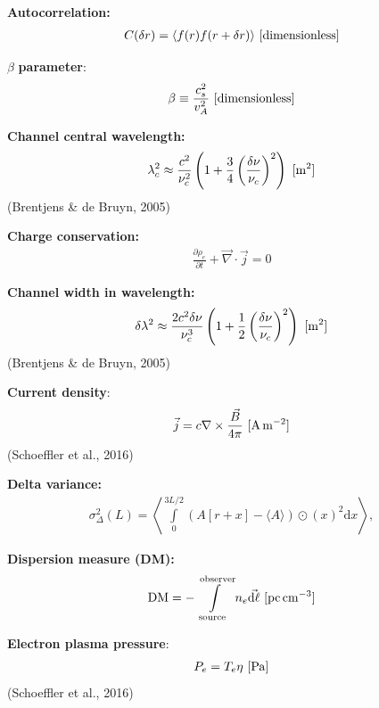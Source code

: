 \documentclass[a4paper,10pt]{article}
\begin{document}
{\noindent}\textbf{Autocorrelation:}
\begin{align*}
    C(\delta r) = \langle f(r)f(r+\delta r)\rangle ~ [{\rm dimensionless}]
\end{align*}

{\noindent}$\beta$ \textbf{parameter}: 
\begin{align*}
    \beta \equiv \frac{c_s^2}{v_A^2} ~ [{\rm dimensionless}]
\end{align*}

{\noindent}\textbf{Channel central wavelength:} 
\begin{align*}
\lambda_c^2 \approx \dfrac{c^2}{\nu_c^2} \left(1+\dfrac{3}{4}\left(\dfrac{\delta\nu}{\nu_c}\right)^2\right) ~ [{\rm m^2}]
\end{align*}
(Brentjens \& de Bruyn, 2005)

{\noindent}\textbf{Charge conservation:} 
\begin{align*}
    \frac{\partial\rho_e}{\partial t} + \vec\nabla\cdot\vec{j} = 0
\end{align*}

{\noindent}\textbf{Channel width in wavelength:} 
\begin{align*}
\delta\lambda^2 \approx \dfrac{2c^2\delta\nu}{\nu_c^3} \left(1+\dfrac{1}{2}\left(\dfrac{\delta\nu}{\nu_c}\right)^2\right) ~ [{\rm m^2}]
\end{align*}
(Brentjens \& de Bruyn, 2005)

{\noindent}\textbf{Current density}:
\begin{align*}
    \vec{j} = c\nabla\times\frac{\vec{B}}{4\pi} ~ [{\rm A\,m^{-2}}]
\end{align*}
(Schoeffler et al., 2016)

{\noindent}\textbf{Delta variance:}
\begin{align*}
    \sigma_\Delta^2(L) = \left\langle \int\limits_0^{3L/2} {(A[r+x]-\langle A\rangle)\odot(x)}^2\mathrm{d}x \right\rangle,
\end{align*}

{\noindent}\textbf{Dispersion measure (DM):}
\begin{align*}
    {\rm DM} = -\int\limits_\mathrm{source}^\mathrm{observer} n_e\vec{{\rm d}\ell} ~ [{\rm pc\,cm^{-3}}]
\end{align*}

{\noindent}\textbf{Electron plasma pressure}:
\begin{align*}
    P_e = T_e \eta ~ [{\rm Pa}]
\end{align*}
(Schoeffler et al., 2016)
\end{document}

